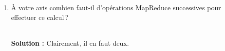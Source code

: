 \documentclass[11pt,a4paper]{article}
\newenvironment{solution}[0]{
~\\ \color{red} \textbf{Solution : }\color{black}}{%
}
\begin{document}
\begin{enumerate}
\begin{enumerate}
\begin{solution}
L'opérateur principal à mettre en œuvre est le \texttt{cogroup}. Le premier
(mais l'ordre n'est pas important) groupe les articles et les auteurs.

\begin{verbatim}
articleEtAuteur = cogroup Articles by ref, Auteurs by refArticle;
\end{verbatim} 

Puis on regroupe la collection obtenue avec la collection des diffusions.


\begin{verbatim}
articlesComplet = cogroup articleEtAuteur by ref, Diffusions by refArticle;
\end{verbatim} 
\end{solution}     

\item À votre avis combien faut-il d'opérations MapReduce successives pour effectuer ce calcul\,?

\begin{solution}
Clairement, il en faut deux.
\end{solution}
    \end{enumerate}
\end{enumerate}
\end{document}
